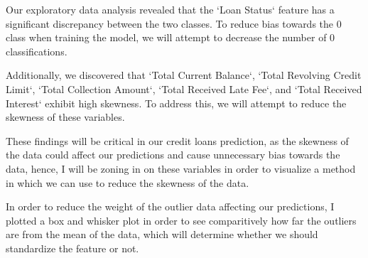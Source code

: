 \documentclass[sigplan]{acmart}
\begin{document}
Our exploratory data analysis revealed that the `Loan Status` feature has a significant discrepancy between the two classes. To reduce bias towards the 0 class when training the model, we will attempt to decrease the number of 0 classifications.

Additionally, we discovered that `Total Current Balance`, `Total Revolving Credit Limit`, `Total Collection Amount`, `Total Received Late Fee`, and `Total Received Interest` exhibit high skewness. To address this, we will attempt to reduce the skewness of these variables.

These findings will be critical in our credit loans prediction, as the skewness of the data could affect our predictions and cause unnecessary bias towards the data,
hence, I will be zoning in on these variables in order to visualize a method in which we can use to reduce the skewness of the data.

In order to reduce the weight of the outlier data affecting our predictions, I plotted a box and whisker plot in order to see comparitively how
far the outliers are from the mean of the data, which will determine whether we should standardize the feature or not.
\end{document}
